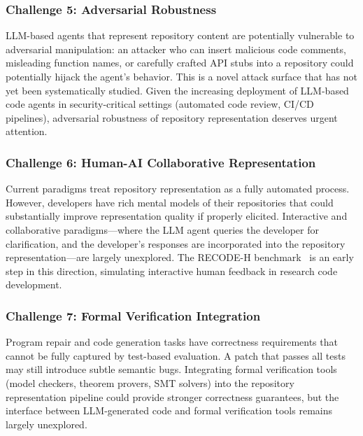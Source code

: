\subsubsection{Challenge 5: Adversarial Robustness}

LLM-based agents that represent repository content are potentially vulnerable to adversarial
manipulation: an attacker who can insert malicious code comments, misleading function names,
or carefully crafted API stubs into a repository could potentially hijack the agent's behavior.
This is a novel attack surface that has not yet been systematically studied. Given the
increasing deployment of LLM-based code agents in security-critical settings (automated
code review, CI/CD pipelines), adversarial robustness of repository representation deserves
urgent attention.

\subsubsection{Challenge 6: Human-AI Collaborative Representation}

Current paradigms treat repository representation as a fully automated process. However,
developers have rich mental models of their repositories that could substantially improve
representation quality if properly elicited. Interactive and collaborative paradigms---where
the LLM agent queries the developer for clarification, and the developer's responses are
incorporated into the repository representation---are largely unexplored. The RECODE-H
benchmark~\cite{miao2026recodeh} is an early step in this direction, simulating interactive
human feedback in research code development.

\subsubsection{Challenge 7: Formal Verification Integration}

Program repair and code generation tasks have correctness requirements that cannot be fully
captured by test-based evaluation. A patch that passes all tests may still introduce subtle
semantic bugs. Integrating formal verification tools (model checkers, theorem provers,
SMT solvers) into the repository representation pipeline could provide stronger correctness
guarantees, but the interface between LLM-generated code and formal verification tools
remains largely unexplored.
